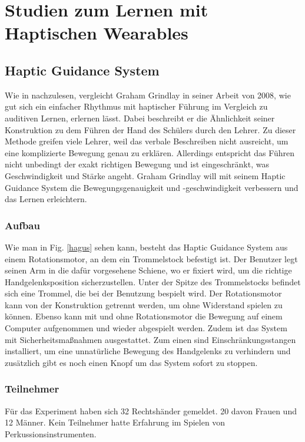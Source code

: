 \documentclass[ngerman,runningheads,a4paper]{llncs}
\begin{document}
\section{Studien zum Lernen mit Haptischen Wearables}


\subsection{Haptic Guidance System}
Wie in \cite{4479984} nachzulesen, vergleicht Graham Grindlay in seiner Arbeit von 2008, wie gut sich ein einfacher Rhythmus mit haptischer Führung im Vergleich zu auditiven Lernen, erlernen lässt.
Dabei beschreibt er die Ähnlichkeit seiner Konstruktion zu dem Führen der Hand des Schülers durch den Lehrer.
Zu dieser Methode greifen viele Lehrer, weil das verbale Beschreiben nicht ausreicht, um eine komplizierte Bewegung genau zu erklären.
Allerdings entspricht das Führen nicht unbedingt der exakt richtigen Bewegung und ist eingeschränkt, was Geschwindigkeit und Stärke angeht.
Graham Grindlay will mit seinem Haptic Guidance System die Bewegungsgenauigkeit und -geschwindigkeit verbessern und das Lernen erleichtern.

\subsubsection{Aufbau}
Wie man in Fig. \ref{hagus} sehen kann, besteht das Haptic Guidance System aus einem Rotationsmotor, an dem ein Trommelstock befestigt ist.
Der Benutzer legt seinen Arm in die dafür vorgesehene Schiene, wo er fixiert wird, um die richtige Handgelenksposition sicherzustellen.
Unter der Spitze des Trommelstocks befindet sich eine Trommel, die bei der Benutzung bespielt wird.
Der Rotationsmotor kann von der Konstruktion getrennt werden, um ohne Widerstand spielen zu können.
Ebenso kann mit und ohne Rotationsmotor die Bewegung auf einem Computer aufgenommen und wieder abgespielt werden.
Zudem ist das System mit Sicherheitsmaßnahmen ausgestattet.
Zum einen sind Einschränkungsstangen installiert, um eine unnatürliche Bewegung des Handgelenks zu verhindern und zusätzlich gibt es noch einen Knopf um das System sofort zu stoppen.

\subsubsection{Teilnehmer}
Für das Experiment haben sich 32 Rechtshänder gemeldet. 20 davon Frauen und 12 Männer. Kein Teilnehmer hatte Erfahrung im Spielen von Perkussionsinstrumenten.
\end{document}
